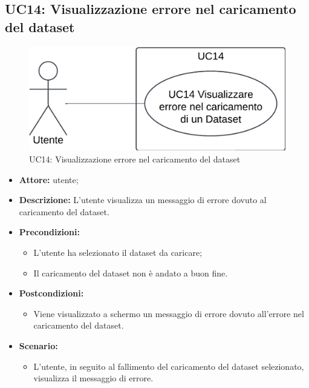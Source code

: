 \pagebreak

\subsection{UC14: Visualizzazione errore nel caricamento del dataset}
\begin{figure}[h!]\centering
    \includegraphics[scale=0.7]{template/images/UC14.png}
    \caption{UC14: Visualizzazione errore nel caricamento del dataset}
\end{figure}
\begin{itemize}    
    \item \textbf{Attore:} utente;
    \item \textbf{Descrizione:} L'utente visualizza un messaggio di errore dovuto al caricamento del dataset.
    \item \textbf{Precondizioni:}    
        \begin{itemize}
            \item L'utente ha selezionato il dataset da caricare;
            \item Il caricamento del dataset non è andato a buon fine.
        \end{itemize}    
    \item \textbf{Postcondizioni:}
        \begin{itemize}
            \item Viene visualizzato a schermo un messaggio di errore dovuto all'errore nel caricamento del dataset.
        \end{itemize}    
    \item \textbf{Scenario:} 
        \begin{itemize}
            \item L'utente, in seguito al fallimento del caricamento del dataset selezionato, visualizza il messaggio di errore.
        \end{itemize}
\end{itemize}